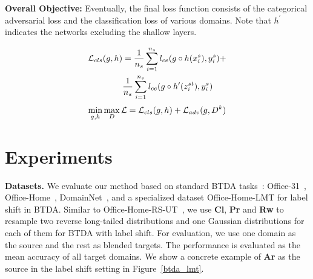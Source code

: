 \documentclass[letterpaper]{article} \usepackage{aaai23}  \usepackage{times}  \usepackage{helvet}  \usepackage{courier}  \usepackage[hyphens]{url}  \usepackage{graphicx} \urlstyle{rm} \def\UrlFont{\rm}  \usepackage{natbib}  \usepackage{caption} \frenchspacing  \setlength{\pdfpagewidth}{8.5in}  \setlength{\pdfpageheight}{11in}
\begin{document}
\noindent\textbf{Overall Objective:} Eventually, the final loss function consists of the categorical adversarial loss and the classification loss of various domains. Note that $h^{\prime}$ indicates the networks excluding the shallow layers.
\begin{small}
\begin{equation}
\setlength{\abovedisplayskip}{2pt}
\setlength{\belowdisplayskip}{2pt}
\begin{split}
\mathcal{L}_{cls}(g,h) & = \frac{1}{n_s} \sum_{i=1}^{n_s} l_{ce}(g\circ h(x_i^s), y_i^s) + \\
& \frac{1}{n_s} \sum_{i=1}^{n_s} l_{ce}(g\circ h^{\prime}(z_i^{st}), y_i^s)
\end{split}
\end{equation}
\begin{equation}
\setlength{\abovedisplayskip}{2pt}
\setlength{\belowdisplayskip}{2pt}
\begin{aligned}
\min_{g,h} \max_D \mathcal{L} = \mathcal{L}_{cls}(g,h) + \mathcal{L}_{adv}(g,D^k)
\end{aligned}
\end{equation}
\end{small}




\section{Experiments}
\noindent\textbf{Datasets.} We evaluate our method based on standard BTDA tasks~\cite{chen2019blending,roy2021curriculum}: Office-31~\cite{office31}, Office-Home~\cite{officehome}, DomainNet~\cite{domainnet}, and a specialized dataset Office-Home-LMT for label shift in BTDA. Similar to Office-Home-RS-UT~\cite{jiang2020implicit}, we use \textbf{Cl}, \textbf{Pr} and \textbf{Rw} to resample two reverse long-tailed distributions and one Gaussian distributions for each of them for BTDA with label shift. For evaluation, we use one domain as the source and the rest as blended targets. The performance is evaluated as the mean accuracy of all target domains. We show a concrete example of \textbf{Ar} as the source in the label shift setting in Figure~\ref{btda_lmt}.
\end{document}
